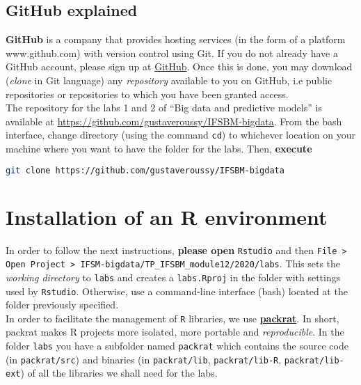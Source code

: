 \documentclass[a4paper, 11pt]{article}
\begin{document}
\subsection{GitHub explained}

\textbf{GitHub} is a company that provides hosting services (in the form of a platform www.github.com) with version 
control using Git. If you do not already have a GitHub account, please sign up at \href{www.github.com}{GitHub}. Once 
this is done, you may download (\textit{clone} in Git language) any \textit{repository} available to you on GitHub, i.e 
public repositories or repositories to which you have been granted access.\\ 

The repository for the labs 1 and 2 of “Big data and predictive models” is available at 
\href{https://github.com/gustaveroussy/IFSBM-bigdata}{https://github.com/gustaveroussy/IFSBM-bigdata}. From the bash 
interface, change directory (using the command \texttt{cd}) to whichever location on your machine where you want to have 
the folder for the labs.  Then, \textbf{execute} 
\begin{lstlisting}[language=bash]
git clone https://github.com/gustaveroussy/IFSBM-bigdata
\end{lstlisting}

\section{Installation of an R environment}

In order to follow the next instructions, \textbf{please open} \texttt{Rstudio} and then \texttt{File > Open Project > 
IFSM-bigdata/TP\_IFSBM\_module12/2020/labs}.  This sets the \textit{working directory} to \texttt{labs} and creates a 
\texttt{labs.Rproj} in the folder with settings used by \texttt{Rstudio}. Otherwise, use a command-line interface (bash) 
located at the folder previously specified.
\\

In order to facilitate the management of \texttt{R} libraries, we use 
\href{https://rstudio.github.io/packrat/}{\textbf{packrat}}. In short, packrat makes R projects more isolated, more 
portable and \textit{reproducible}. In the folder \texttt{labs} you have a subfolder named \texttt{packrat} which 
contains the source code (in \texttt{packrat/src}) and binaries (in \texttt{packrat/lib}, \texttt{packrat/lib-R}, 
\texttt{packrat/lib-ext}) of all the libraries we shall need for the labs. 
\end{document}
